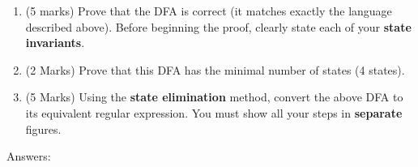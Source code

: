 \documentclass[12pt]{article}
\begin{document}
\begin{enumerate}
\item {(5 marks)} Prove that the DFA is correct (it matches exactly the language described above). Before beginning the proof, clearly state each of your \textbf{state invariants}.

\item {(2 Marks)}
Prove that this DFA has the minimal number of states (4 states).

\item {(5 Marks)} 
Using the \textbf{state elimination} method, convert the above DFA to its equivalent regular expression. You must show all your steps in \textbf{separate} figures.
\end{enumerate}
Answers:
\end{document}
